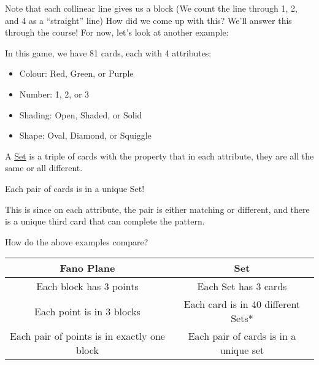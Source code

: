 \begin{minipage}{\textwidth}
    \centering
\end{minipage}

Note that each collinear line gives us a block (We count the line through 1, 2, and 4 as a ``straight'' line)
How did we come up with this?
We'll answer this through the course!
For now, let's look at another example:

\begin{example}
    In this game, we have 81 cards, each with 4 attributes:
    \begin{itemize}
        \item Colour: Red, Green, or Purple
        \item Number: 1, 2, or 3
        \item Shading: Open, Shaded, or Solid
        \item Shape: Oval, Diamond, or Squiggle
    \end{itemize}
    
    A \ul{Set} is a triple of cards with the property that in each attribute, they are all the same or all different.

    \begin{note}
        Each pair of cards is in a unique Set!
    \end{note}
    This is since on each attribute, the pair is either matching or different, and there is a unique third card that can complete the pattern.
\end{example}

How do the above examples compare?

\begin{minipage}{\textwidth}
    \begin{center}        
    \begin{tabular}{c|c}
        Fano Plane & Set \\
        \hline
        Each block has 3 points & Each Set has 3 cards \\
        Each point is in 3 blocks & Each card is in 40 different Sets* \\
        Each pair of points is in exactly one block & Each pair of cards is in a unique set
    \end{tabular}
    \end{center}
\end{minipage}

